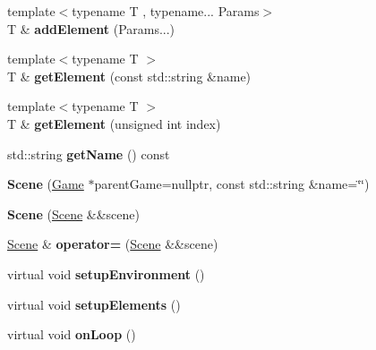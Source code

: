 \begin{DoxyCompactItemize}
{\footnotesize template$<$typename T , typename... Params$>$ }\\T \& {\bfseries add\+Element} (Params...)
\item 
\mbox{\label{classbkengine_1_1Scene_a3af9c0e5920908dc2b55c09f3ac63f05}} 
{\footnotesize template$<$typename T $>$ }\\T \& {\bfseries get\+Element} (const std\+::string \&name)
\item 
\mbox{\label{classbkengine_1_1Scene_afe0c7bb1ad5cfd3051d77e453275afbc}} 
{\footnotesize template$<$typename T $>$ }\\T \& {\bfseries get\+Element} (unsigned int index)
\item 
\mbox{\label{classbkengine_1_1Scene_ad38687f5ba8e021eae3be69d65eb8793}} 
std\+::string {\bfseries get\+Name} () const
\item 
\mbox{\label{classbkengine_1_1Scene_a5e0f80e658596a1b5641bdcadd748eb1}} 
{\bfseries Scene} (\hyperlink{classbkengine_1_1Game}{Game} $\ast$parent\+Game=nullptr, const std\+::string \&name=\char`\"{}\char`\"{})
\item 
\mbox{\label{classbkengine_1_1Scene_a908f0ea17201652c169a1ccd2ed9e6c1}} 
{\bfseries Scene} (\hyperlink{classbkengine_1_1Scene}{Scene} \&\&scene)
\item 
\mbox{\label{classbkengine_1_1Scene_a85ff28a4e5b89c819cf145bcd6b2f96e}} 
\hyperlink{classbkengine_1_1Scene}{Scene} \& {\bfseries operator=} (\hyperlink{classbkengine_1_1Scene}{Scene} \&\&scene)
\item 
\mbox{\label{classbkengine_1_1Scene_ac6e562fa1a4acfc552231f6dc31b6319}} 
virtual void {\bfseries setup\+Environment} ()
\item 
\mbox{\label{classbkengine_1_1Scene_a59db4aed9b0a6c097c53f367a468a894}} 
virtual void {\bfseries setup\+Elements} ()
\item 
\mbox{\label{classbkengine_1_1Scene_a2fbdf62053d4c57c27a1a73af8b1aad1}} 
virtual void {\bfseries on\+Loop} ()

\end{DoxyCompactItemize}
